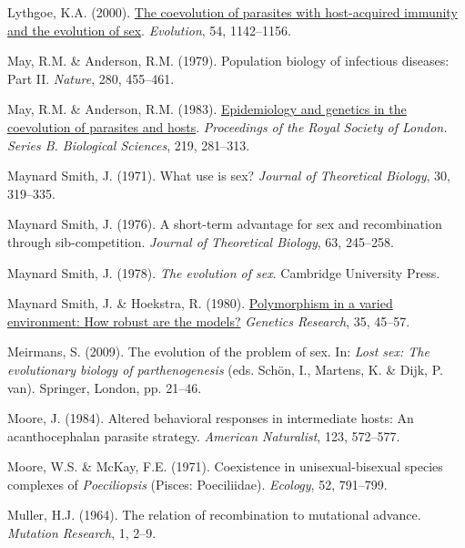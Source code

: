\documentclass[
  letterpaper,
]{book}
\newlength{\cslhangindent}
\newenvironment{CSLReferences}[2] %
 {\begin{list}{}{%
  \setlength{\itemindent}{0pt}
  \setlength{\leftmargin}{0pt}
  \setlength{\parsep}{0pt}
  \ifodd #1
   \setlength{\leftmargin}{\cslhangindent}
   \setlength{\itemindent}{-1\cslhangindent}
  \fi
  \setlength{\itemsep}{#2\baselineskip}}}
 {\end{list}}
\begin{document}
\begin{CSLReferences}{1}{0}
Lythgoe, K.A. (2000).
\href{https://doi.org/10.1111/j.0014-3820.2000.tb00550.x}{The
coevolution of parasites with host-acquired immunity and the evolution
of sex}. \emph{Evolution}, 54, 1142--1156.

May, R.M. \& Anderson, R.M. (1979). Population biology of infectious
diseases: Part II. \emph{Nature}, 280, 455--461.

May, R.M. \& Anderson, R.M. (1983).
\href{https://doi.org/10.1098/rspb.1983.0075}{Epidemiology and genetics
in the coevolution of parasites and hosts}. \emph{Proceedings of the
Royal Society of London. Series B. Biological Sciences}, 219, 281--313.

Maynard Smith, J. (1971). What use is sex? \emph{Journal of Theoretical
Biology}, 30, 319--335.

Maynard Smith, J. (1976). A short-term advantage for sex and
recombination through sib-competition. \emph{Journal of Theoretical
Biology}, 63, 245--258.

Maynard Smith, J. (1978). \emph{The evolution of sex}. Cambridge
University Press.

Maynard Smith, J. \& Hoekstra, R. (1980).
\href{https://doi.org/10.1017/S0016672300013926}{Polymorphism in a
varied environment: How robust are the models?} \emph{Genetics
Research}, 35, 45--57.

Meirmans, S. (2009). The evolution of the problem of sex. In: \emph{Lost
sex: The evolutionary biology of parthenogenesis} (eds. Schön, I.,
Martens, K. \& Dijk, P. van). Springer, London, pp. 21--46.

Moore, J. (1984). Altered behavioral responses in intermediate hosts: An
acanthocephalan parasite strategy. \emph{American Naturalist}, 123,
572--577.

Moore, W.S. \& McKay, F.E. (1971). Coexistence in unisexual-bisexual
species complexes of \emph{{P}oeciliopsis} ({Pisces: Poeciliidae}).
\emph{Ecology}, 52, 791--799.

Muller, H.J. (1964). The relation of recombination to mutational
advance. \emph{Mutation Research}, 1, 2--9.


\end{CSLReferences}
\end{document}
